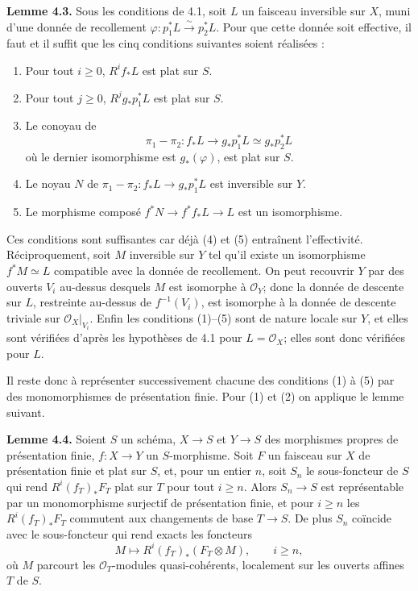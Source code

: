 \documentclass[11pt]{article}
\begin{document}
\textbf{Lemme 4.3.} Sous les conditions de 4.1, soit \(L\) un faisceau inversible sur \(X\), muni d'une donnée de recollement \(\varphi:p_1^*L\xrightarrow{\sim}p_2^*L\). Pour que cette donnée soit effective, il faut et il suffit que les cinq conditions suivantes soient réalisées :
\begin{enumerate}[label=\arabic*)]
\item Pour tout \(i\ge0\), \(R^if_*L\) est plat sur \(S\).
\item Pour tout \(j\ge0\), \(R^jg_*p_1^*L\) est plat sur \(S\).
\item Le conoyau de
\[
  \pi_1-\pi_2:f_*L\longrightarrow g_*p_1^*L\simeq g_*p_2^*L
\]
où le dernier isomorphisme est \(g_*(\varphi)\), est plat sur \(S\).
\item Le noyau \(N\) de \(\pi_1-\pi_2:f_*L\to g_*p_1^*L\) est inversible sur \(Y\).
\item Le morphisme composé \(f^*N\to f^*f_*L\to L\) est un isomorphisme.
\end{enumerate}
Ces conditions sont suffisantes car déjà (4) et (5) entraînent l'effectivité. Réciproquement, soit \(M\) inversible sur \(Y\) tel qu'il existe un isomorphisme \(f^*M\simeq L\) compatible avec la donnée de recollement. On peut recouvrir \(Y\) par des ouverts \(V_i\) au-dessus desquels \(M\) est isomorphe à \(\mathcal O_Y\); donc la donnée de descente sur \(L\), restreinte au-dessus de \(f^{-1}(V_i)\), est isomorphe à la donnée de descente triviale sur \(\mathcal O_X|_{V_i}\). Enfin les conditions (1)--(5) sont de nature locale sur \(Y\), et elles sont vérifiées d'après les hypothèses de 4.1 pour \(L=\mathcal O_X\); elles sont donc vérifiées pour \(L\).

Il reste donc à représenter successivement chacune des conditions (1) à (5) par des monomorphismes de présentation finie. Pour (1) et (2) on applique le lemme suivant.

\textbf{Lemme 4.4.} Soient \(S\) un schéma, \(X\to S\) et \(Y\to S\) des morphismes propres de présentation finie, \(f:X\to Y\) un \(S\)-morphisme. Soit \(F\) un faisceau sur \(X\) de présentation finie et plat sur \(S\), et, pour un entier \(n\), soit \(S_n\) le sous-foncteur de \(S\) qui rend \(R^i(f_T)_*F_T\) plat sur \(T\) pour tout \(i\ge n\). Alors \(S_n\to S\) est représentable par un monomorphisme surjectif de présentation finie, et pour \(i\ge n\) les \(R^i(f_T)_*F_T\) commutent aux changements de base \(T\to S\). De plus \(S_n\) coïncide avec le sous-foncteur qui rend exacts les foncteurs
\[
  M\longmapsto R^i(f_T)_*(F_T\otimes M),\qquad i\ge n,
\]
où \(M\) parcourt les \(\mathcal O_T\)-modules quasi-cohérents, localement sur les ouverts affines \(T\) de \(S\).
\end{document}
